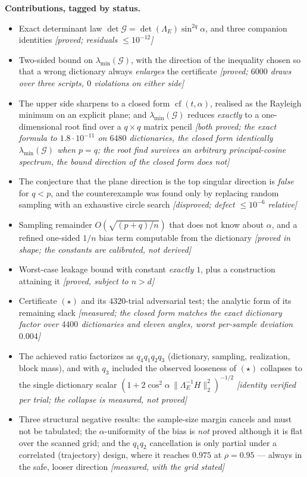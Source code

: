 \documentclass[11pt]{article}
\theoremstyle{remark}
\newcommand{\Gr}{\mathcal{G}}
\newcommand{\Le}{\Lambda_E}
\newcommand{\Cnorm}{\bigl\|\Le^{-1}H\bigr\|_2^2}
\begin{document}
\medskip
\noindent\textbf{Contributions, tagged by status.}
\begin{itemize}\itemsep1pt
\item Exact determinant law $\det\Gr=\det(\Le)\sin^{2q}\alpha$, and three companion
identities \hfill \emph{[proved; residuals $\le10^{-12}$]}
\item Two-sided bound on $\lambda_{\min}(\Gr)$, with the direction of the inequality
chosen so that a wrong dictionary always \emph{enlarges} the certificate
\hfill \emph{[proved; $6000$ draws over three scripts, $0$ violations on either side]}
\item The upper side sharpens to a closed form $\operatorname{cf}(t,\alpha)$, realised as the
Rayleigh minimum on an explicit plane; and $\lambda_{\min}(\Gr)$ reduces \emph{exactly} to a
one-dimensional root find over a $q\times q$ matrix pencil
\hfill \emph{[both proved; the exact formula to $1.8\cdot10^{-11}$ on $6480$ dictionaries, the
closed form \emph{identically} $\lambda_{\min}(\Gr)$ when $p=q$; the root find survives an arbitrary
principal-cosine spectrum, the bound \emph{direction} of the closed form does not]}
\item The conjecture that the plane direction is the top singular direction is
\emph{false} for $q<p$, and the counterexample was found only by replacing random sampling with
an exhaustive circle search \hfill \emph{[disproved; defect $\le10^{-6}$ relative]}
\item Sampling remainder $O(\sqrt{(p+q)/n})$ that does not know about $\alpha$, and a
refined one-sided $1/n$ bias term computable from the dictionary \hfill \emph{[proved in
shape; the constants are calibrated, not derived]}
\item Worst-case leakage bound with constant \emph{exactly $1$}, plus a construction
attaining it \hfill \emph{[proved, subject to $n>d$]}
\item Certificate $(\star)$ and its $4320$-trial adversarial test; the analytic form of
its remaining slack \hfill \emph{[measured; the closed form matches the exact dictionary
factor over $4400$ dictionaries and eleven angles, worst per-sample deviation $0.004$]}
\item The achieved ratio factorizes as $q_4q_1q_2q_3$ (dictionary, sampling, realization,
block mass), and with $q_3$ included the observed looseness of $(\star)$ collapses to the
single dictionary scalar $(1+2\cos^2\alpha\,\Cnorm)^{-1/2}$ \hfill \emph{[identity verified
per trial; the collapse is measured, not proved]}
\item Three structural negative results: the sample-size margin cancels and must not be
tabulated; the $\alpha$-uniformity of the bias is \emph{not} proved although it is
flat over the scanned grid; and the $q_1q_2$ cancellation is only partial under a
correlated (trajectory) design, where it reaches $0.975$ at $\rho=0.95$ --- always in the
safe, looser direction \hfill \emph{[measured, with the grid stated]}
\end{itemize}
\end{document}

